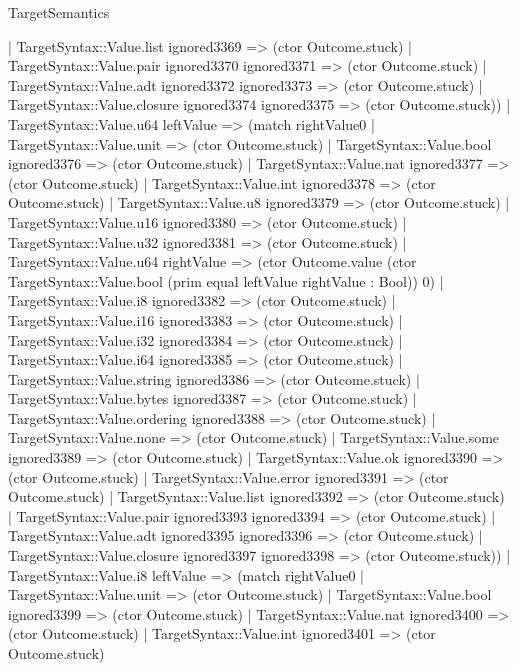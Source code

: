 \begin{lexlean}{TargetSemantics}
\begin{semanticmodule}
{              | TargetSyntax::Value.list ignored3369 => (ctor Outcome.stuck)
              | TargetSyntax::Value.pair ignored3370 ignored3371 => (ctor Outcome.stuck)
              | TargetSyntax::Value.adt ignored3372 ignored3373 => (ctor Outcome.stuck)
              | TargetSyntax::Value.closure ignored3374 ignored3375 => (ctor Outcome.stuck))
            | TargetSyntax::Value.u64 leftValue => (match rightValue0
              | TargetSyntax::Value.unit => (ctor Outcome.stuck)
              | TargetSyntax::Value.bool ignored3376 => (ctor Outcome.stuck)
              | TargetSyntax::Value.nat ignored3377 => (ctor Outcome.stuck)
              | TargetSyntax::Value.int ignored3378 => (ctor Outcome.stuck)
              | TargetSyntax::Value.u8 ignored3379 => (ctor Outcome.stuck)
              | TargetSyntax::Value.u16 ignored3380 => (ctor Outcome.stuck)
              | TargetSyntax::Value.u32 ignored3381 => (ctor Outcome.stuck)
              | TargetSyntax::Value.u64 rightValue => (ctor Outcome.value (ctor TargetSyntax::Value.bool (prim equal leftValue rightValue : Bool)) 0)
              | TargetSyntax::Value.i8 ignored3382 => (ctor Outcome.stuck)
              | TargetSyntax::Value.i16 ignored3383 => (ctor Outcome.stuck)
              | TargetSyntax::Value.i32 ignored3384 => (ctor Outcome.stuck)
              | TargetSyntax::Value.i64 ignored3385 => (ctor Outcome.stuck)
              | TargetSyntax::Value.string ignored3386 => (ctor Outcome.stuck)
              | TargetSyntax::Value.bytes ignored3387 => (ctor Outcome.stuck)
              | TargetSyntax::Value.ordering ignored3388 => (ctor Outcome.stuck)
              | TargetSyntax::Value.none => (ctor Outcome.stuck)
              | TargetSyntax::Value.some ignored3389 => (ctor Outcome.stuck)
              | TargetSyntax::Value.ok ignored3390 => (ctor Outcome.stuck)
              | TargetSyntax::Value.error ignored3391 => (ctor Outcome.stuck)
              | TargetSyntax::Value.list ignored3392 => (ctor Outcome.stuck)
              | TargetSyntax::Value.pair ignored3393 ignored3394 => (ctor Outcome.stuck)
              | TargetSyntax::Value.adt ignored3395 ignored3396 => (ctor Outcome.stuck)
              | TargetSyntax::Value.closure ignored3397 ignored3398 => (ctor Outcome.stuck))
            | TargetSyntax::Value.i8 leftValue => (match rightValue0
              | TargetSyntax::Value.unit => (ctor Outcome.stuck)
              | TargetSyntax::Value.bool ignored3399 => (ctor Outcome.stuck)
              | TargetSyntax::Value.nat ignored3400 => (ctor Outcome.stuck)
              | TargetSyntax::Value.int ignored3401 => (ctor Outcome.stuck)
}
\end{semanticmodule}
\end{lexlean}
